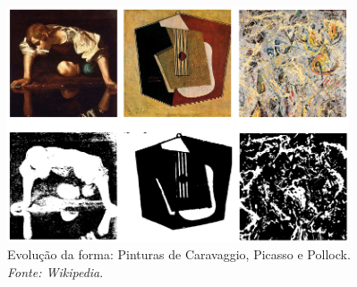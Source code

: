 \documentclass{beamer}
\begin{document}

\begin{frame}

\begin{figure}
\begin{center}
    \includegraphics[width=0.9\textwidth]{figs/comp_formas.png}
  \end{center}
  \caption{Evolução da forma: Pinturas de Caravaggio, Picasso e Pollock. \textit{Fonte: Wikipedia}.
        }
  \label{fig:comp_formas}
\end{figure}

\end{frame}



\end{document}
